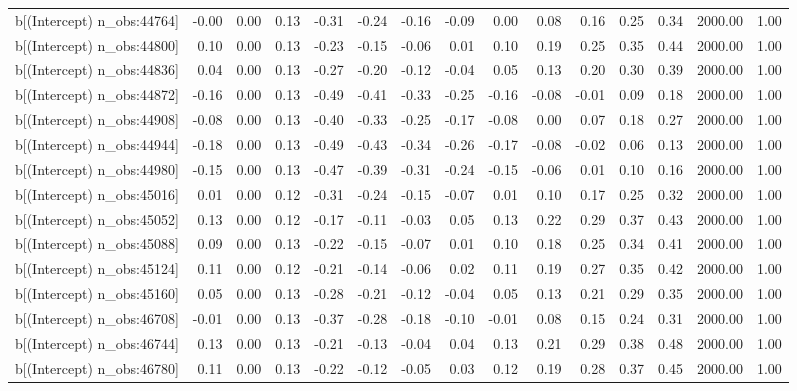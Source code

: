 \begin{table}[ht]
\begin{tabular}{rrrrrrrrrrrrrrr}
  b[(Intercept) n\_obs:44764] & -0.00 & 0.00 & 0.13 & -0.31 & -0.24 & -0.16 & -0.09 & 0.00 & 0.08 & 0.16 & 0.25 & 0.34 & 2000.00 & 1.00 \\ 
  b[(Intercept) n\_obs:44800] & 0.10 & 0.00 & 0.13 & -0.23 & -0.15 & -0.06 & 0.01 & 0.10 & 0.19 & 0.25 & 0.35 & 0.44 & 2000.00 & 1.00 \\ 
  b[(Intercept) n\_obs:44836] & 0.04 & 0.00 & 0.13 & -0.27 & -0.20 & -0.12 & -0.04 & 0.05 & 0.13 & 0.20 & 0.30 & 0.39 & 2000.00 & 1.00 \\ 
  b[(Intercept) n\_obs:44872] & -0.16 & 0.00 & 0.13 & -0.49 & -0.41 & -0.33 & -0.25 & -0.16 & -0.08 & -0.01 & 0.09 & 0.18 & 2000.00 & 1.00 \\ 
  b[(Intercept) n\_obs:44908] & -0.08 & 0.00 & 0.13 & -0.40 & -0.33 & -0.25 & -0.17 & -0.08 & 0.00 & 0.07 & 0.18 & 0.27 & 2000.00 & 1.00 \\ 
  b[(Intercept) n\_obs:44944] & -0.18 & 0.00 & 0.13 & -0.49 & -0.43 & -0.34 & -0.26 & -0.17 & -0.08 & -0.02 & 0.06 & 0.13 & 2000.00 & 1.00 \\ 
  b[(Intercept) n\_obs:44980] & -0.15 & 0.00 & 0.13 & -0.47 & -0.39 & -0.31 & -0.24 & -0.15 & -0.06 & 0.01 & 0.10 & 0.16 & 2000.00 & 1.00 \\ 
  b[(Intercept) n\_obs:45016] & 0.01 & 0.00 & 0.12 & -0.31 & -0.24 & -0.15 & -0.07 & 0.01 & 0.10 & 0.17 & 0.25 & 0.32 & 2000.00 & 1.00 \\ 
  b[(Intercept) n\_obs:45052] & 0.13 & 0.00 & 0.12 & -0.17 & -0.11 & -0.03 & 0.05 & 0.13 & 0.22 & 0.29 & 0.37 & 0.43 & 2000.00 & 1.00 \\ 
  b[(Intercept) n\_obs:45088] & 0.09 & 0.00 & 0.13 & -0.22 & -0.15 & -0.07 & 0.01 & 0.10 & 0.18 & 0.25 & 0.34 & 0.41 & 2000.00 & 1.00 \\ 
  b[(Intercept) n\_obs:45124] & 0.11 & 0.00 & 0.12 & -0.21 & -0.14 & -0.06 & 0.02 & 0.11 & 0.19 & 0.27 & 0.35 & 0.42 & 2000.00 & 1.00 \\ 
  b[(Intercept) n\_obs:45160] & 0.05 & 0.00 & 0.13 & -0.28 & -0.21 & -0.12 & -0.04 & 0.05 & 0.13 & 0.21 & 0.29 & 0.35 & 2000.00 & 1.00 \\ 
  b[(Intercept) n\_obs:46708] & -0.01 & 0.00 & 0.13 & -0.37 & -0.28 & -0.18 & -0.10 & -0.01 & 0.08 & 0.15 & 0.24 & 0.31 & 2000.00 & 1.00 \\ 
  b[(Intercept) n\_obs:46744] & 0.13 & 0.00 & 0.13 & -0.21 & -0.13 & -0.04 & 0.04 & 0.13 & 0.21 & 0.29 & 0.38 & 0.48 & 2000.00 & 1.00 \\ 
  b[(Intercept) n\_obs:46780] & 0.11 & 0.00 & 0.13 & -0.22 & -0.12 & -0.05 & 0.03 & 0.12 & 0.19 & 0.28 & 0.37 & 0.45 & 2000.00 & 1.00 \\ 

\end{tabular}
\end{table}
